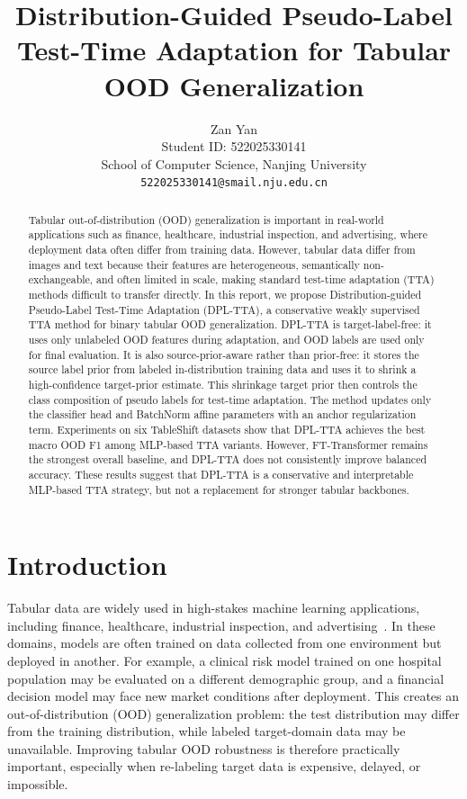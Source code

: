 \documentclass{article}
\title{Distribution-Guided Pseudo-Label Test-Time Adaptation for Tabular OOD Generalization}
\author{%
  Zan Yan \\
  Student ID: 522025330141 \\
  School of Computer Science, Nanjing University \\
  \texttt{522025330141@smail.nju.edu.cn}
}
\begin{document}
\maketitle

\begin{abstract}
Tabular out-of-distribution (OOD) generalization is important in real-world applications such as finance, healthcare, industrial inspection, and advertising, where deployment data often differ from training data. However, tabular data differ from images and text because their features are heterogeneous, semantically non-exchangeable, and often limited in scale, making standard test-time adaptation (TTA) methods difficult to transfer directly. In this report, we propose Distribution-guided Pseudo-Label Test-Time Adaptation (DPL-TTA), a conservative weakly supervised TTA method for binary tabular OOD generalization. DPL-TTA is target-label-free: it uses only unlabeled OOD features during adaptation, and OOD labels are used only for final evaluation. It is also source-prior-aware rather than prior-free: it stores the source label prior from labeled in-distribution training data and uses it to shrink a high-confidence target-prior estimate. This shrinkage target prior then controls the class composition of pseudo labels for test-time adaptation. The method updates only the classifier head and BatchNorm affine parameters with an anchor regularization term. Experiments on six TableShift datasets show that DPL-TTA achieves the best macro OOD F1 among MLP-based TTA variants. However, FT-Transformer remains the strongest overall baseline, and DPL-TTA does not consistently improve balanced accuracy. These results suggest that DPL-TTA is a conservative and interpretable MLP-based TTA strategy, but not a replacement for stronger tabular backbones.
\end{abstract}

\section{Introduction}

Tabular data are widely used in high-stakes machine learning applications, including finance, healthcare, industrial inspection, and advertising~\citep{gardner2023tableshift}. In these domains, models are often trained on data collected from one environment but deployed in another. For example, a clinical risk model trained on one hospital population may be evaluated on a different demographic group, and a financial decision model may face new market conditions after deployment. This creates an out-of-distribution (OOD) generalization problem: the test distribution may differ from the training distribution, while labeled target-domain data may be unavailable. Improving tabular OOD robustness is therefore practically important, especially when re-labeling target data is expensive, delayed, or impossible.
\end{document}
